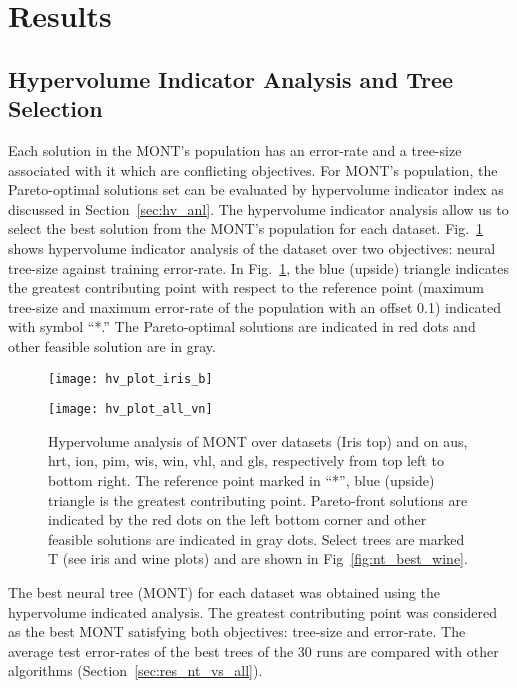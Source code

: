 \documentclass[conference]{IEEEtran}
\begin{document}
\section{Results}
\label{sec:res}
\subsection{Hypervolume Indicator Analysis and Tree Selection}
\label{sec:res_nt_hv}
Each solution in the MONT's population has an error-rate and a tree-size associated with it which are conflicting objectives. For MONT's population, the Pareto-optimal solutions set can be evaluated by hypervolume indicator index  as discussed in Section~\ref{sec:hv_anl}. The hypervolume indicator analysis allow us to select the best solution from the MONT's population for each dataset. Fig.~\ref{fig:hv_plots} shows hypervolume indicator analysis of the dataset over two objectives: neural tree-size against training error-rate. In Fig.~\ref{fig:hv_plots}, the blue (upside) triangle indicates the greatest contributing point with respect to the reference point (maximum tree-size and maximum error-rate of the population with an offset 0.1) indicated with symbol ``*.'' The Pareto-optimal solutions are indicated in red dots and other feasible solution are in gray.

\begin{figure}
\centerline{\texttt{[image: hv\_plot\_iris\_b]}}
    
    \centerline{\texttt{[image: hv\_plot\_all\_vn]}}
    
    
    \caption{Hypervolume analysis of MONT over datasets (Iris top) and on aus, hrt, ion, pim, wis, win, vhl, and gls, respectively from top left to bottom right. The reference point marked in ``*'', blue (upside) triangle is the greatest contributing point. Pareto-front solutions are indicated by the red dots on the left bottom corner and other feasible solutions are indicated in gray dots. Select trees are marked T (see iris and wine plots) and are shown in Fig~\ref{fig:nt_best_wine}.} \label{fig:hv_plots}
\end{figure}

The best neural tree (MONT) for each dataset was obtained using the hypervolume indicated analysis. The greatest contributing point was considered as the best MONT satisfying both objectives: tree-size and error-rate. The average test error-rates of the best trees of the 30 runs are compared with other algorithms (Section~\ref{sec:res_nt_vs_all}).
\end{document}
